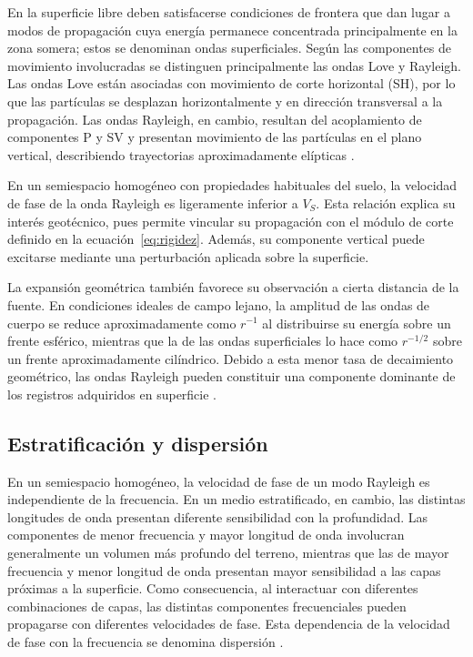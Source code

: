 En la superficie libre deben satisfacerse condiciones de frontera que dan lugar a modos de propagación cuya energía permanece concentrada principalmente en la zona somera; estos se denominan ondas superficiales. Según las componentes de movimiento involucradas se distinguen principalmente las ondas Love y Rayleigh. Las ondas Love están asociadas con movimiento de corte horizontal (SH), por lo que las partículas se desplazan horizontalmente y en dirección transversal a la propagación. Las ondas Rayleigh, en cambio, resultan del acoplamiento de componentes P y SV y presentan movimiento de las partículas en el plano vertical, describiendo trayectorias aproximadamente elípticas \citep{Foti2014,Foti2018}.

En un semiespacio homogéneo con propiedades habituales del suelo, la velocidad de fase de la onda Rayleigh es ligeramente inferior a $V_S$. Esta relación explica su interés geotécnico, pues permite vincular su propagación con el módulo de corte definido en la ecuación~\eqref{eq:rigidez}. Además, su componente vertical puede excitarse mediante una perturbación aplicada sobre la superficie.

La expansión geométrica también favorece su observación a cierta distancia de la fuente. En condiciones ideales de campo lejano, la amplitud de las ondas de cuerpo se reduce aproximadamente como $r^{-1}$ al distribuirse su energía sobre un frente esférico, mientras que la de las ondas superficiales lo hace como $r^{-1/2}$ sobre un frente aproximadamente cilíndrico. Debido a esta menor tasa de decaimiento geométrico, las ondas Rayleigh pueden constituir una componente dominante de los registros adquiridos en superficie \citep{Foti2014}.


\subsection{Estratificación y dispersión}
\label{sec:dispersion}

En un semiespacio homogéneo, la velocidad de fase de un modo Rayleigh es independiente de la frecuencia. En un medio estratificado, en cambio, las distintas longitudes de onda presentan diferente sensibilidad con la profundidad. Las componentes de menor frecuencia y mayor longitud de onda involucran generalmente un volumen más profundo del terreno, mientras que las de mayor frecuencia y menor longitud de onda presentan mayor sensibilidad a las capas próximas a la superficie. Como consecuencia, al interactuar con diferentes combinaciones de capas, las distintas componentes frecuenciales pueden propagarse con diferentes velocidades de fase. Esta dependencia de la velocidad de fase con la frecuencia se denomina dispersión \citep{Foti2014,Foti2018}.

